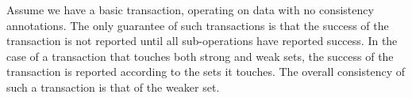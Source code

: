 Assume we have a basic transaction, operating on data with no consistency
annotations. The only guarantee of such transactions is that the success of the
transaction is not reported until all sub-operations have reported success. In
the case of a transaction that touches both strong and weak sets, the success
of the transaction is reported according to the sets it touches. The overall
consistency of such a transaction is that of the weaker set. 

%
%




